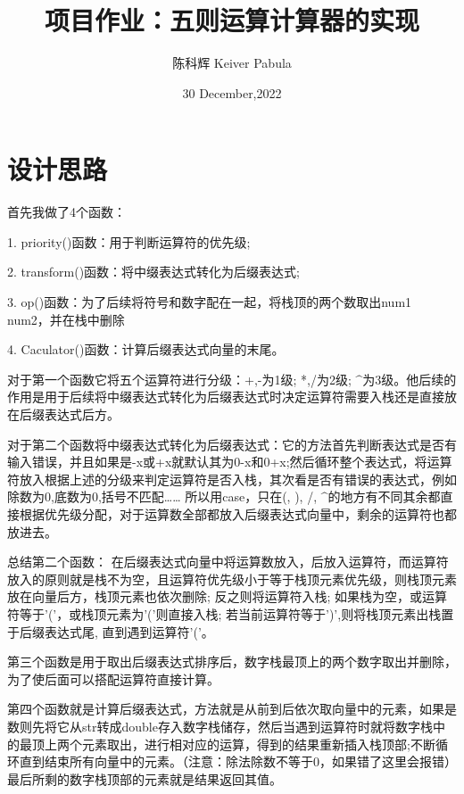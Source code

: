 \documentclass{ctexart}
\title{项目作业：五则运算计算器的实现}
\author{陈科辉 Keiver Pabula}
\date{30 December,2022}
\begin{document}
\maketitle

\section{设计思路}
首先我做了4个函数：

1. priority()函数：用于判断运算符的优先级;

2. transform()函数：将中缀表达式转化为后缀表达式;

3. op()函数：为了后续将符号和数字配在一起，将栈顶的两个数取出num1 num2，并在栈中删除

4. Caculator()函数：计算后缀表达式向量的末尾。

对于第一个函数它将五个运算符进行分级：+,-为1级; *,/为2级; $\^$为3级。他后续的作用是用于后续将中缀表达式转化为后缀表达式时决定运算符需要入栈还是直接放在后缀表达式后方。

对于第二个函数将中缀表达式转化为后缀表达式：它的方法首先判断表达式是否有输入错误，并且如果是-x或+x就默认其为0-x和0+x;然后循环整个表达式，将运算符放入根据上述的分级来判定运算符是否入栈，其次看是否有错误的表达式，例如除数为0,底数为0,括号不匹配…… 所以用case，只在(, ), /, $\^$的地方有不同其余都直接根据优先级分配，对于运算数全部都放入后缀表达式向量中，剩余的运算符也都放进去。

总结第二个函数：
在后缀表达式向量中将运算数放入，后放入运算符，而运算符放入的原则就是栈不为空，且运算符优先级小于等于栈顶元素优先级，则栈顶元素放在向量后方，栈顶元素也依次删除; 反之则将运算符入栈; 如果栈为空，或运算符等于'('，或栈顶元素为'('则直接入栈; 若当前运算符等于')',则将栈顶元素出栈置于后缀表达式尾, 直到遇到运算符'('。

第三个函数是用于取出后缀表达式排序后，数字栈最顶上的两个数字取出并删除，为了使后面可以搭配运算符直接计算。

第四个函数就是计算后缀表达式，方法就是从前到后依次取向量中的元素，如果是数则先将它从str转成double存入数字栈储存，然后当遇到运算符时就将数字栈中的最顶上两个元素取出，进行相对应的运算，得到的结果重新插入栈顶部;不断循环直到结束所有向量中的元素。（注意：除法除数不等于0，如果错了这里会报错）最后所剩的数字栈顶部的元素就是结果返回其值。
\end{document}
